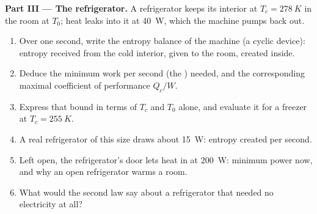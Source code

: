 \begin{problem}
\medskip
\noindent\textbf{Part III --- The refrigerator.}
A refrigerator keeps its interior at $T_c = \qty{278}{K}$ in the room at
$T_0$; heat leaks into it at \qty{40}{W}, which the machine pumps back out.
\begin{enumerate}[resume]
  \item Over one second, write the entropy balance of the machine (a
        cyclic device): entropy received from the cold interior, given to
        the room, created inside.
  \item Deduce the minimum work per second (the ) needed,
        and the corresponding maximal coefficient of performance
        $Q_c/W$.
  \item Express that bound in terms of $T_c$ and $T_0$ alone, and evaluate
        it for a freezer at $T_c = \qty{255}{K}$.
  \item A real refrigerator of this size draws about \qty{15}{W}: entropy
        created per second.
  \item Left open, the refrigerator's door lets heat in at \qty{200}{W}:
        minimum power now, and why an open refrigerator warms a room.
  \item What would the second law say about a refrigerator that needed
        no electricity at all?
\end{enumerate}


\end{problem}
